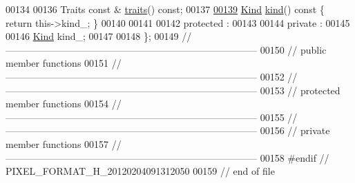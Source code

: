 \begin{DoxyCode}
00134 
00136     Traits \textcolor{keyword}{const} & \hyperlink{classhryky_1_1pixel_1_1_format_a996feea3534e20ea7feac5d72a99b4c7}{traits}() \textcolor{keyword}{const};
00137 
\hypertarget{pixel__format_8h_source_l00139}{}\hyperlink{classhryky_1_1pixel_1_1_format_aef9836d7d4d18179d09ddfcc3e7758a6}{00139}     \hyperlink{classhryky_1_1pixel_1_1_format_ac65267000940a3f9a74c01f82ed616e4}{Kind} \hyperlink{classhryky_1_1pixel_1_1_format_aef9836d7d4d18179d09ddfcc3e7758a6}{kind}()\textcolor{keyword}{ const }\{ \textcolor{keywordflow}{return} this->kind\_; \}
00140 
00141 
00142 \textcolor{keyword}{protected} :
00143 
00144 \textcolor{keyword}{private} :
00145 
00146     \hyperlink{classhryky_1_1_kind}{Kind}    kind\_;
00147 
00148 \};
00149 \textcolor{comment}{//
      ------------------------------------------------------------------------------}
00150 \textcolor{comment}{// public member functions}
00151 \textcolor{comment}{//
      ------------------------------------------------------------------------------}
00152 \textcolor{comment}{//
      ------------------------------------------------------------------------------}
00153 \textcolor{comment}{// protected member functions}
00154 \textcolor{comment}{//
      ------------------------------------------------------------------------------}
00155 \textcolor{comment}{//
      ------------------------------------------------------------------------------}
00156 \textcolor{comment}{// private member functions}
00157 \textcolor{comment}{//
      ------------------------------------------------------------------------------}
00158 \textcolor{preprocessor}{#endif // PIXEL\_FORMAT\_H\_20120204091312050}
00159 \textcolor{preprocessor}{}\textcolor{comment}{// end of file}
\end{DoxyCode}
